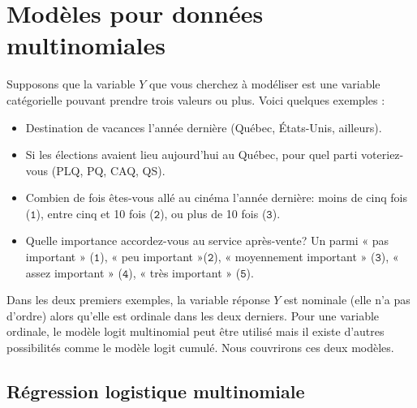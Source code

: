 \documentclass[
  11pt,
  letterpaper,
]{book}
\providecommand{\tightlist}{%
  \setlength{\itemsep}{0pt}\setlength{\parskip}{0pt}}\usepackage{longtable,booktabs,array}
\theoremstyle{definition}
\theoremstyle{remark}
\begin{document}
\hypertarget{moduxe8les-pour-donnuxe9es-multinomiales}{%
\section{Modèles pour données
multinomiales}\label{moduxe8les-pour-donnuxe9es-multinomiales}}

Supposons que la variable \(Y\) que vous cherchez à modéliser est une
variable catégorielle pouvant prendre trois valeurs ou plus. Voici
quelques exemples :

\begin{itemize}
\tightlist
\item
  Destination de vacances l'année dernière (Québec, États-Unis,
  ailleurs).
\item
  Si les élections avaient lieu aujourd'hui au Québec, pour quel parti
  voteriez-vous (PLQ, PQ, CAQ, QS).
\item
  Combien de fois êtes-vous allé au cinéma l'année dernière: moins de
  cinq fois (\(\texttt{1}\)), entre cinq et 10 fois (\(\texttt{2}\)), ou
  plus de 10 fois (\(\texttt{3}\)).
\item
  Quelle importance accordez-vous au service après-vente? Un parmi « pas
  important » (\(\texttt{1}\)), « peu important »(\(\texttt{2}\)), «
  moyennement important » (\(\texttt{3}\)), « assez important »
  (\(\texttt{4}\)), « très important » (\(\texttt{5}\)).
\end{itemize}

Dans les deux premiers exemples, la variable réponse \(Y\) est nominale
(elle n'a pas d'ordre) alors qu'elle est ordinale dans les deux
derniers. Pour une variable ordinale, le modèle logit multinomial peut
être utilisé mais il existe d'autres possibilités comme le modèle logit
cumulé. Nous couvrirons ces deux modèles.

\hypertarget{ruxe9gression-logistique-multinomiale}{%
\subsection{Régression logistique
multinomiale}\label{ruxe9gression-logistique-multinomiale}}
\end{document}
